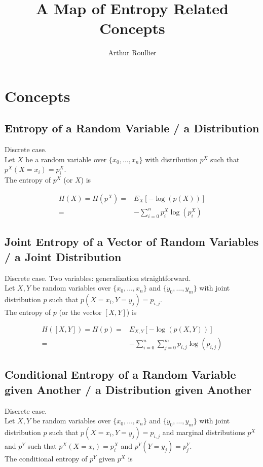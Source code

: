 \documentclass{article}
\title{A Map of Entropy Related Concepts}
\author{Arthur Roullier}
\begin{document}
\maketitle




\section{Concepts}

\subsection{Entropy of a Random Variable / a Distribution}
Discrete case.\\
Let $X$ be a random variable over $\{x_0, \dots, x_n\}$ with distribution $p^X$ such that $p^X(X=x_i) = p^X_i$.\\
The entropy of $p^X$ (or $X$) is

\begin{eqnarray*}
    H(X) = H(p^X) =& E_X[-\log(p(X))] \\
                =& - \sum_{i=0}^n p^X_i \log(p^X_i)
\end{eqnarray*}

\subsection{Joint Entropy of a Vector of Random Variables / a Joint Distribution}
Discrete case. Two variables: generalization straightforward. \\
Let $X,Y$ be  random variables over $\{x_0, \dots, x_n\}$ and $\{y_0, \dots, y_m\}$ with joint distribution $p$ such that $p(X=x_i,Y=y_j) = p_{i,j}$.\\
The entropy of $p$ (or the vector $[X,Y]$) is

\begin{eqnarray*}
    H([X,Y]) = H(p) =& E_{X,Y}[-\log(p(X,Y))] \\
                    =& - \sum_{i=0}^n \sum_{j=0}^m p_{i,j} \log(p_{i,j})
\end{eqnarray*}


\subsection{Conditional Entropy of a Random Variable given Another / a  Distribution given Another}
Discrete case.\\
Let $X,Y$ be  random variables over $\{x_0, \dots, x_n\}$ and $\{y_0, \dots, y_m\}$ with joint distribution $p$ such that $p(X=x_i,Y=y_j) = p_{i,j}$ and marginal distributions $p^X$ and $p^Y$ such that $p^X(X = x_i) = p^X_i$ and $p^Y(Y = y_j) = p^Y_j$.\\
The conditional entropy of $p^Y$ given $p^X$ is
\end{document}
